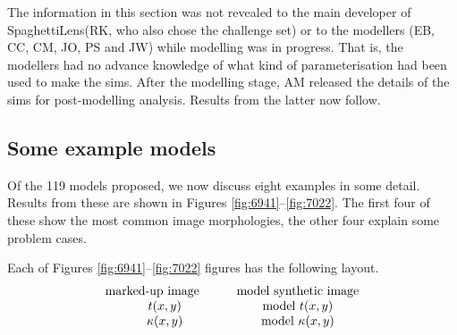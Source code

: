 \documentclass[usenatbib]{mn2e}
\newcommand{\spl}{SpaghettiLens\xspace}
\begin{document}
The information in this section was not revealed to the main developer
of \spl (RK, who also chose the challenge set) or to the modellers
(EB, CC, CM, JO, PS and JW) while modelling was in progress.  That is,
the modellers had no advance knowledge of what kind of
parameterisation had been used to make the sims.  After the modelling
stage, AM released the details of the sims for post-modelling
analysis.  Results from the latter now follow.



\subsection{Some example models} \label{sec:example_models}

Of the 119 models proposed, we now discuss eight examples in some
detail.  Results from these are shown in Figures
\ref{fig:6941}--\ref{fig:7022}.  The first four of these show the most
common image morphologies, the other four explain some problem cases.

Each of Figures \ref{fig:6941}--\ref{fig:7022} figures has the
following layout.
$$ \begin{matrix}
\hbox{marked-up image} \qquad &\hbox{model synthetic image} \\
t(x,y)                        &\hbox{model } t(x,y) \\
\kappa(x,y)                   &\hbox{model } \kappa(x,y)
\end{matrix} $$

\FloatBarrier
\end{document}
